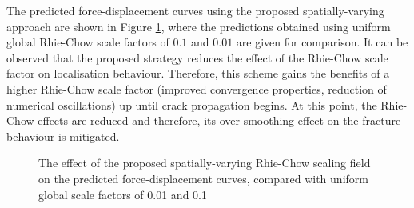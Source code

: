 \documentclass[sn-mathphys,Numbered]{sn-jnl}%
\begin{document}
The predicted force-displacement curves using the proposed spatially-varying approach are shown in Figure \ref{fig:RC_proposed}, where the predictions obtained using uniform global Rhie-Chow scale factors of $0.1$ and $0.01$ are given for comparison.
It can be observed that the proposed strategy reduces the effect of the Rhie-Chow scale factor on localisation behaviour.
Therefore, this scheme gains the benefits of a higher Rhie-Chow scale factor (improved convergence properties, reduction of numerical oscillations) up until crack propagation begins.
At this point, the Rhie-Chow effects are reduced and therefore, its over-smoothing effect on the fracture behaviour is mitigated.
\begin{figure}[htb]
	\centering
	\caption{The effect of the proposed spatially-varying Rhie-Chow scaling field on the predicted force-displacement curves, compared with uniform global scale factors of 0.01 and 0.1}
	\label{fig:RC_proposed}
\end{figure}
\end{document}
